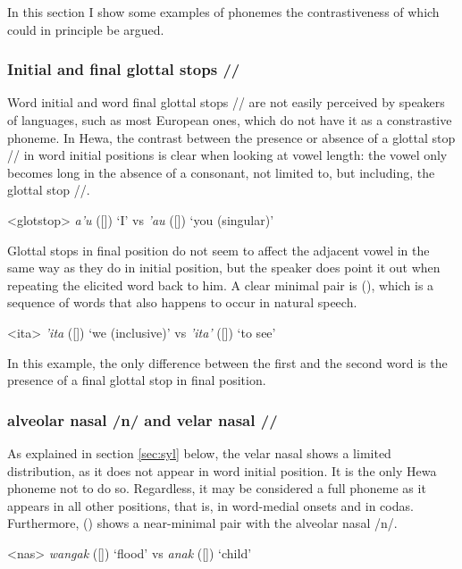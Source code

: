 \documentclass[../hewa_main-subfiles.tex]{subfiles}
\begin{document}
In this section I show some examples of phonemes the contrastiveness of which could in principle be argued.

\subsubsection{Initial and final glottal stops /\textglotstop/}

Word initial and word final glottal stops /\textglotstop / are not easily perceived by speakers of languages, such as most European ones, which do not have it as a constrastive phoneme. In Hewa, the contrast between the presence or absence of a glottal stop /\textglotstop / in word initial positions is clear when looking at vowel length: the vowel only becomes long in the absence of a consonant, not limited to, but including, the glottal stop /\textglotstop /.

\ex<glotstop> %
\textit{a'u} ([]) `I' vs \textit{'au} ([]) `you (singular)'
\xe


Glottal stops in final position do not seem to affect the adjacent vowel in the same way as they do in initial position, but the speaker does point it out when repeating the elicited word back to him. A clear minimal pair is (), which is a sequence of words that also happens to occur in natural speech.

\ex<ita> \textit{'ita} ([]) `we (inclusive)' vs \textit{'ita'} ([]) `to see'
\xe

In this example, the only difference between the first and the second word is the presence of a final glottal stop in final position.

\subsubsection{alveolar nasal /n/ and velar nasal //}

As explained in section \ref{sec:syl} below, the velar nasal  shows a limited distribution, as it does not appear in word initial position. It is the only Hewa phoneme not to do so. Regardless, it may be considered a full phoneme as it appears in all other positions, that is, in word-medial onsets and in codas. Furthermore, () shows a near-minimal pair with the alveolar nasal /n/.

\ex<nas> %
\textit{wangak} ([]) `flood' vs \textit{anak} ([]) `child'
\xe
\end{document}
